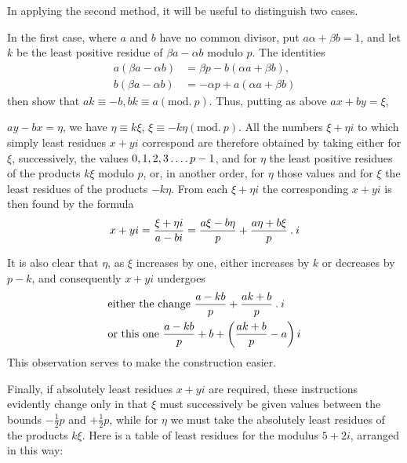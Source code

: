 In applying the second method, it will be useful to distinguish two cases.

In the first case, where $a$ and $b$ have no common divisor, put $a\alpha+\beta b=1$, and let $k$ be the least positive residue of $\beta a-\alpha b$ modulo $p$. The identities
\[
\begin{aligned}
a(\beta a-\alpha b)&=\beta p-b(\alpha a+\beta b),\\
b(\beta a-\alpha b)&=-\alpha p+a(\alpha a+\beta b)
\end{aligned}
\]
then show that $ak\equiv-b,bk\equiv a(\mathrm{mod.}\ p)$. Thus, putting as above $ax+by=\xi$,

%
$ay-bx=\eta$, we have $\eta\equiv k\xi$, $\xi\equiv-k\eta(\mathrm{mod.}\ p)$. All the numbers $\xi+\eta i$ to which simply least residues $x+yi$ correspond are therefore obtained by taking either for $\xi$, successively, the values $0,1,2,3\mathinner{.\,.\,.\,.} p-1$, and for $\eta$ the least positive residues of the products $k\xi$ modulo $p$, or, in another order, for $\eta$ those values and for $\xi$ the least residues of the products $-k\eta$. From each $\xi+\eta i$ the corresponding $x+yi$ is then found by the formula
\[
x+yi=\frac{\xi+\eta i}{a-bi}=\frac{a\xi-b\eta}{p}+\frac{a\eta+b\xi}{p}\mathbin{.} i
\]

It is also clear that $\eta$, as $\xi$ increases by one, either increases by $k$ or decreases by $p-k$, and consequently $x+yi$ undergoes
\[
\begin{aligned}
&\text{either the change }\frac{a-kb}{p}+\frac{ak+b}{p}\mathbin{.} i\\
&\text{or this one }\frac{a-kb}{p}+b+\left(\frac{ak+b}{p}-a\right)i
\end{aligned}
\]
This observation serves to make the construction easier.

Finally, if absolutely least residues $x+yi$ are required, these instructions evidently change only in that $\xi$ must successively be given values between the bounds $-\frac12p$ and $+\frac12p$, while for $\eta$ we must take the absolutely least residues of the products $k\xi$. Here is a table of least residues for the modulus $5+2i$, arranged in this way:

